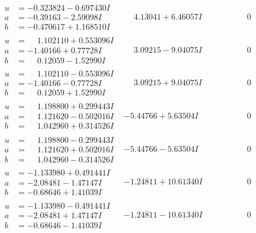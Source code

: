 \documentclass[1p]{elsarticle_modified}
\theoremstyle{definition}
\begin{document}
$$\begin{array}{c|c|c}
\begin{aligned}
u &= -0.323824 - 0.697430 I \\
a &= -0.39163 - 2.59098 I \\
b &= -0.470617 + 1.168510 I\end{aligned}
 & \phantom{-}4.13041 + 6.46057 I & \phantom{-0.000000 } 0 \\ \hline\begin{aligned}
u &= \phantom{-}1.102110 + 0.553096 I \\
a &= -1.40166 + 0.77728 I \\
b &= \phantom{-}0.12059 - 1.52990 I\end{aligned}
 & \phantom{-}3.09215 - 9.04075 I & \phantom{-0.000000 } 0 \\ \hline\begin{aligned}
u &= \phantom{-}1.102110 - 0.553096 I \\
a &= -1.40166 - 0.77728 I \\
b &= \phantom{-}0.12059 + 1.52990 I\end{aligned}
 & \phantom{-}3.09215 + 9.04075 I & \phantom{-0.000000 } 0 \\ \hline\begin{aligned}
u &= \phantom{-}1.198800 + 0.299443 I \\
a &= \phantom{-}1.121620 - 0.502016 I \\
b &= \phantom{-}1.042960 + 0.314526 I\end{aligned}
 & -5.44766 + 5.63504 I & \phantom{-0.000000 } 0 \\ \hline\begin{aligned}
u &= \phantom{-}1.198800 - 0.299443 I \\
a &= \phantom{-}1.121620 + 0.502016 I \\
b &= \phantom{-}1.042960 - 0.314526 I\end{aligned}
 & -5.44766 - 5.63504 I & \phantom{-0.000000 } 0 \\ \hline\begin{aligned}
u &= -1.133980 + 0.491441 I \\
a &= -2.08481 - 1.47147 I \\
b &= -0.68646 + 1.41039 I\end{aligned}
 & -1.24811 + 10.61340 I & \phantom{-0.000000 } 0 \\ \hline\begin{aligned}
u &= -1.133980 - 0.491441 I \\
a &= -2.08481 + 1.47147 I \\
b &= -0.68646 - 1.41039 I\end{aligned}
 & -1.24811 - 10.61340 I & \phantom{-0.000000 } 0 \\ \hline\begin{aligned}

\end{aligned}
\end{array}$$
\end{document}
